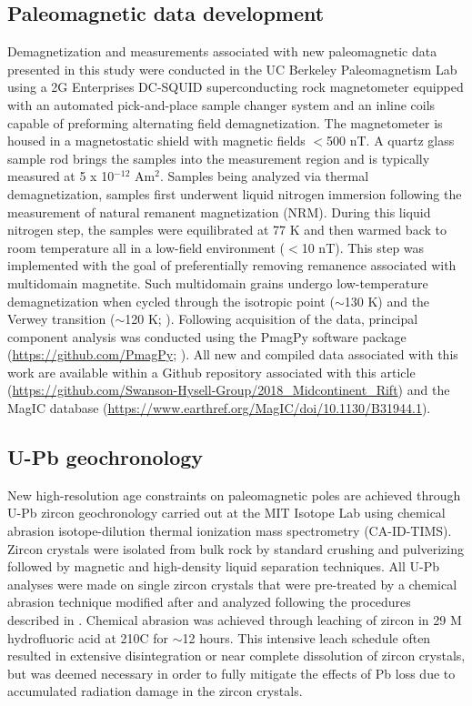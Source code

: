 \documentclass[11pt,letterpaper]{article}
\begin{document}
\subsection{Paleomagnetic data development}

Demagnetization and measurements associated with new paleomagnetic data presented in this study were conducted in the UC Berkeley Paleomagnetism Lab using a 2G Enterprises DC-SQUID superconducting rock magnetometer equipped with an automated pick-and-place sample changer system and an inline coils capable of preforming alternating field demagnetization. The magnetometer is housed in a magnetostatic shield with magnetic fields $<$500 nT. A quartz glass sample rod brings the samples into the measurement region and is typically measured at 5 x 10$^{-12}$ Am$^2$. Samples being analyzed via thermal demagnetization, samples first underwent liquid nitrogen immersion following the measurement of natural remanent magnetization (NRM). During this liquid nitrogen step, the samples were equilibrated at 77 K and then warmed back to room temperature all in a low-field environment ($<$10 nT). This step was implemented with the goal of preferentially removing remanence associated with multidomain magnetite. Such multidomain grains undergo low-temperature demagnetization when cycled through the isotropic point ($\sim$130 K) and the Verwey transition ($\sim$120 K; \citealp{Verwey1939a, Feinberg2015a}). Following acquisition of the data, principal component analysis \citep{Kirschvink1980a} was conducted using the PmagPy software package (\url{https://github.com/PmagPy}; \citealp{Tauxe2016a}). All new and compiled data associated with this work are available within a Github repository associated with this article (\url{https://github.com/Swanson-Hysell-Group/2018_Midcontinent_Rift}) and the MagIC database (\url{https://www.earthref.org/MagIC/doi/10.1130/B31944.1}).

\subsection{U-Pb geochronology}

New high-resolution age constraints on paleomagnetic poles are achieved through U-Pb zircon geochronology carried out at the MIT Isotope Lab using chemical abrasion isotope-dilution thermal ionization mass spectrometry (CA-ID-TIMS). Zircon crystals were isolated from bulk rock by standard crushing and pulverizing followed by magnetic and high-density liquid separation techniques. All U-Pb analyses were made on single zircon crystals that were pre-treated by a chemical abrasion technique modified after \cite{Mattinson2005a} and analyzed following the procedures described in \cite{Ramezani2011a}. Chemical abrasion was achieved through leaching of zircon in 29 M hydrofluoric acid at 210\textdegree C for $\sim$12 hours. This intensive leach schedule often resulted in extensive disintegration or near complete dissolution of zircon crystals, but was deemed necessary in order to fully mitigate the effects of Pb loss due to accumulated radiation damage in the zircon crystals.
\end{document}
